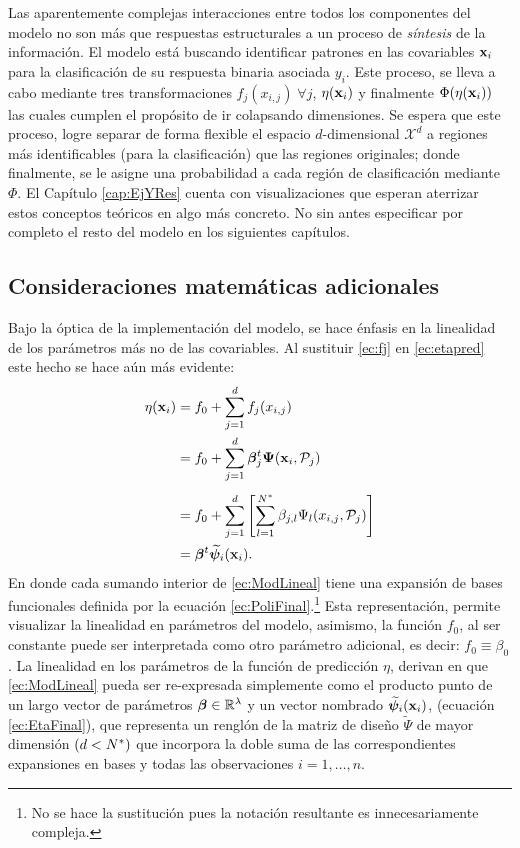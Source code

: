\documentclass[../Main/Main.tex]{subfiles}
\begin{document}
Las aparentemente complejas interacciones entre todos los componentes del modelo no son más que respuestas estructurales a un proceso de \textit{síntesis} de la información. El modelo está buscando identificar patrones en las covariables $\mathbf{x}_i$ para la clasificación de su respuesta binaria asociada $y_i$. Este proceso, se lleva a cabo mediante tres transformaciones $f_j(x_{i,j}) \; \forall j$, $\eta(\mathbf{x}_i)$ y finalmente $\Phi(\eta(\mathbf{x}_i))$ las cuales cumplen el propósito de ir colapsando dimensiones. Se espera que este proceso, logre separar de forma flexible el espacio $d$-dimensional $\mathcal{X}^d$ a regiones más identificables (para la clasificación) que las regiones originales; donde finalmente, se le asigne una probabilidad a cada región de clasificación mediante $\Phi$. El Capítulo \ref{cap:EjYRes} cuenta con visualizaciones que esperan aterrizar estos conceptos teóricos en algo más concreto. No sin antes especificar por completo el resto del modelo en los siguientes capítulos. 

\subsection{Consideraciones matemáticas adicionales}
Bajo la óptica de la implementación del modelo, se hace énfasis en la linealidad de los parámetros más no de las covariables. Al sustituir \eqref{ec:fj} en \eqref{ec:etapred} este hecho se hace aún más evidente:
\begin{align}
	\eta(\mathbf{x}_i) &= f_0 + \sum_{j=1}^d f_j(x_{i,j}) \nonumber\\
			   &= f_0 + \sum_{j=1}^d \bm{\beta}^t_j\bm{\Psi}(\mathbf{x}_i,\mathcal{P}_j) \nonumber\\[4pt]
	&= f_0 + \sum_{j=1}^d  \left[\sum_{l = 1}^{N^*} \beta_{j,l} \Psi_l(x_{i,j}, \mathcal{P}_j)\right]  \label{ec:ModLineal} \\  
	& = \bm{\beta}^t\widetilde{\bm{\psi}}_i(\mathbf{x}_i). \label{ec:EtaFinal}
\end{align}
En donde cada sumando interior de \eqref{ec:ModLineal} tiene una expansión de bases funcionales definida por la ecuación \eqref{ec:PoliFinal}.\footnote{No se hace la sustitución pues la notación resultante es innecesariamente compleja.} Esta representación, permite visualizar la linealidad en parámetros del modelo, asimismo, la función $f_0$, al ser constante puede ser interpretada como otro parámetro adicional, es decir: $f_0 \equiv \beta_0$. La linealidad en los parámetros de la función de predicción $\eta$, derivan en que \eqref{ec:ModLineal} pueda ser re-expresada simplemente como el producto punto de un largo vector de parámetros $\bm{\beta}\in\mathbb{R}^\lambda$ y un vector nombrado $\widetilde{\bm{\psi}}_i(\mathbf{x}_i)$, (ecuación \eqref{ec:EtaFinal}), que representa un renglón de la matriz de diseño $\widetilde{\Psi}$ de mayor dimensión $(d<N^*)$ que incorpora la doble suma de las correspondientes expansiones en bases y todas las observaciones $i = 1,\ldots,n$. 
\end{document}

